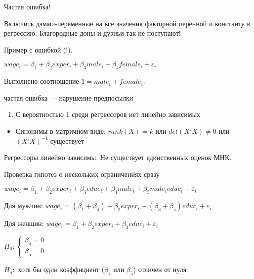 \documentclass[ignorenonframetext,]{beamer}
\begin{document}
\begin{frame}{Частая ошибка!}

Включить дамми-переменные на все значения факторной перенной и константу
в регрессию. Благородные доны и дуэньи так не поступают!

Пример с ошибкой (!).

\(wage_i = \beta_1 + \beta_2 exper_i + \beta_3 male_i + \beta_4 female_i +\varepsilon_i\)

Выполнено соотношение \(1 = male_i + female_i\).

\end{frame}

\begin{frame}{частая ошибка --- нарушение предпосылки}

\begin{enumerate}
\def\labelenumi{\arabic{enumi}.}
\setcounter{enumi}{7}
\itemsep1pt\parskip0pt
\item
  С вероятностью 1 среди регрессоров нет линейно зависимых
\end{enumerate}

\begin{itemize}
\itemsep1pt\parskip0pt
\item
  Синонимы в матричном виде: \(rank(X)=k\) или \(det(X'X)\neq 0\) или
  \((X'X)^{-1}\) существует
\end{itemize}

Регрессоры линейно зависимы. Не существует единственных оценок МНК.

\end{frame}

\begin{frame}{Проверка гипотез о нескольких ограничениях сразу}

\(wage_i = \beta_1 + \beta_2 exper_i + \beta_3 educ_i + \beta_4 male_i + \beta_5 male_i educ_i + \varepsilon_i\)

Для мужчин:
\(wage_i = (\beta_1+\beta_4) + \beta_2 exper_i + (\beta_3 + \beta_5) educ_i + \varepsilon_i\)

Для женщин:
\(wage_i = \beta_1 + \beta_2 exper_i + \beta_3 educ_i + \varepsilon_i\)

\(H_0: \begin{cases} \beta_4 = 0 \\ \beta_5 = 0 \end{cases}\)

\(H_a:\) хотя бы один коэффициент (\(\beta_4\) или \(\beta_5\)) отличен
от нуля

\end{frame}
\end{document}
